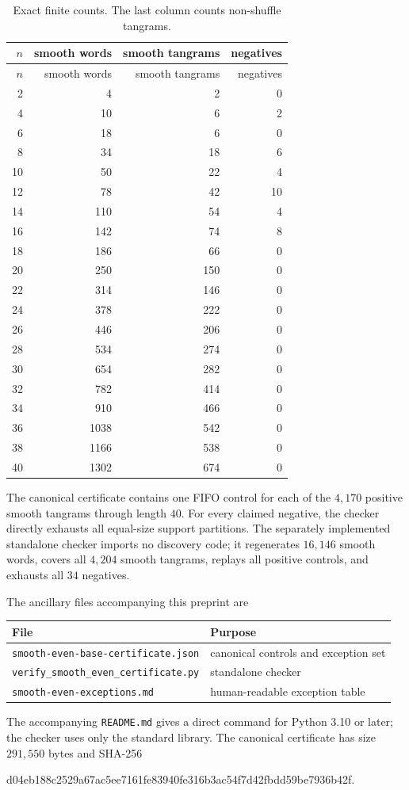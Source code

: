\documentclass[11pt]{article}
\theoremstyle{definition}
\theoremstyle{remark}
\begin{document}
\begin{longtable}{rrrr}
\caption{Exact finite counts.  The last column counts non-shuffle
tangrams.}\label{tab:counts}\\
\toprule
$n$ & smooth words & smooth tangrams & negatives\\
\midrule
\endfirsthead
\toprule
$n$ & smooth words & smooth tangrams & negatives\\
\midrule
\endhead
2&4&2&0\\
4&10&6&2\\
6&18&6&0\\
8&34&18&6\\
10&50&22&4\\
12&78&42&10\\
14&110&54&4\\
16&142&74&8\\
18&186&66&0\\
20&250&150&0\\
22&314&146&0\\
24&378&222&0\\
26&446&206&0\\
28&534&274&0\\
30&654&282&0\\
32&782&414&0\\
34&910&466&0\\
36&1038&542&0\\
38&1166&538&0\\
40&1302&674&0\\
\bottomrule
\end{longtable}

The canonical certificate contains one FIFO control for each of the
$4{,}170$ positive smooth tangrams through length $40$.  For every
claimed negative, the checker directly exhausts all equal-size support
partitions.  The separately implemented standalone checker imports no discovery code; it
regenerates $16{,}146$ smooth words, covers all $4{,}204$ smooth
tangrams, replays all positive controls, and exhausts all $34$
negatives.

The ancillary files accompanying this preprint are
\begin{center}
\begin{tabular}{ll}
\toprule
File & Purpose\\
\midrule
\texttt{smooth-even-base-certificate.json}
 & canonical controls and exception set\\
\texttt{verify\_smooth\_even\_certificate.py}
 & standalone checker\\
\texttt{smooth-even-exceptions.md}
 & human-readable exception table\\
\bottomrule
\end{tabular}
\end{center}
The accompanying \texttt{README.md} gives a direct command for Python
3.10 or later; the checker uses only the standard library.
The canonical certificate has size $291{,}550$ bytes and SHA-256
\begin{center}
\small\ttfamily
d04eb188c2529a67ac5ee7161fe83940fe316b3ac54f7d42fbdd59be7936b42f.
\end{center}
\end{document}
